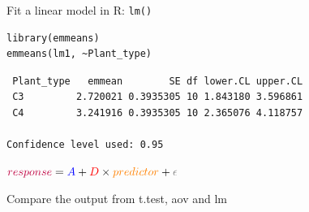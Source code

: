 \documentclass[10pt]{beamer}
\makeatletter
\newenvironment{kframe}{%
 \def\at@end@of@kframe{}%
 \ifinner\ifhmode%
  \def\at@end@of@kframe{\end{minipage}}%
  \begin{minipage}{\columnwidth}%
 \fi\fi%
 \def\FrameCommand##1{\hskip\@totalleftmargin \hskip-\fboxsep
 \colorbox{shadecolor}{##1}\hskip-\fboxsep
     \hskip-\linewidth \hskip-\@totalleftmargin \hskip\columnwidth}%
 \MakeFramed {\advance\hsize-\width
   \@totalleftmargin\z@ \linewidth\hsize
   \@setminipage}}%
 {\par\unskip\endMakeFramed%
 \at@end@of@kframe}
\newenvironment{knitrout}{}{} %
\makeatother
\begin{document}
\begin{frame}[fragile]{Fit a linear model in R: \texttt{lm()}}

\begin{knitrout}
\color{fgcolor}\begin{kframe}
\begin{verbatim}
library(emmeans)
emmeans(lm1, ~Plant_type)
\end{verbatim}
\end{kframe}
\end{knitrout}


\begin{knitrout}
\color{fgcolor}\begin{kframe}
\footnotesize
\begin{verbatim}
 Plant_type   emmean        SE df lower.CL upper.CL
 C3         2.720021 0.3935305 10 1.843180 3.596861
 C4         3.241916 0.3935305 10 2.365076 4.118757

Confidence level used: 0.95 
\end{verbatim}
\end{kframe}
\end{knitrout}

\pause
 ${\color{purple}{response}} = {\color{blue}{A}} + {\color{red}{D}} \times {\color{orange}{predictor}} + {\color{gray}{\epsilon}}$

\end{frame}

\begin{frame}{Compare the output from t.test, aov and lm}
 
\end{frame}
\end{document}
